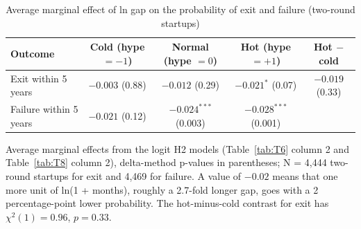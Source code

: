 \begin{table}[tbp]
\centering\footnotesize
\caption{Average marginal effect of ln gap on the probability of exit and failure (two-round startups)}
\label{tab:T7}
\begin{tabular}{lcccc}
\toprule
Outcome & Cold (hype $=-1$) & Normal (hype $=0$) & Hot (hype $=+1$) & Hot $-$ cold \\
\midrule
Exit within 5 years & $-0.003$ (0.88) & $-0.012$ (0.29) & $-0.021^{*}$ (0.07) & $-0.019$ (0.33) \\
Failure within 5 years & $-0.021$ (0.12) & $-0.024^{***}$ (0.003) & $-0.028^{***}$ (0.001) & \\
\bottomrule
\end{tabular}
\par\smallskip\parbox{0.95\linewidth}{\scriptsize Average marginal effects from the logit H2 models (Table~\ref{tab:T6} column 2 and Table~\ref{tab:T8} column 2), delta-method p-values in parentheses; N = 4,444 two-round startups for exit and 4,469 for failure. A value of $-0.02$ means that one more unit of ln(1 + months), roughly a 2.7-fold longer gap, goes with a 2 percentage-point lower probability. The hot-minus-cold contrast for exit has $\chi^2(1)=0.96$, $p=0.33$.}
\end{table}
